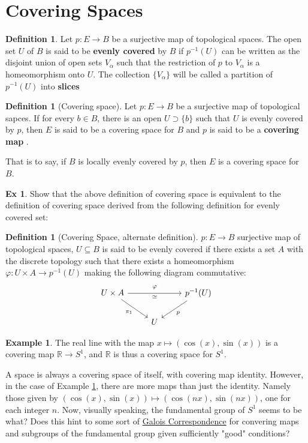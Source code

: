 \documentclass[10pt, openany]{book}
\newcommand{\bb}[1]{\mathbb{#1}}
\theoremstyle{plain}
\theoremstyle{definition}
\newtheorem{definition}[theorem]{Definition}
\newtheorem{exercise}{Ex}[section]
\newtheorem{example}{Example}
\theoremstyle{remark}
\begin{document}
\section{Covering Spaces}
\begin{definition}
  Let $p : E\rightarrow B$ be a surjective map of topological spaces. The open set $U$ of $B$ is said to be \textbf{evenly covered} by $B$ if $p^{-1}(U)$ can be written as the disjoint union of open sets $V_{\alpha}$ such that the restriction of $p$ to $V_{\alpha}$ is a homeomorphism onto $U$. The collection $\{V_{\alpha}\}$ will be called a partition of $p^{-1}(U)$ into \textbf{slices}
\end{definition}
\begin{definition}[Covering space]
  Let $p:E\rightarrow B$ be a surjective map of topological sapces. If for every $b\in B$, there is an open $U\supset \{b\}$ such that $U$ is evenly covered by $p$, then $E$ is said to be a covering space for $B$ and $p$ is said to be a \textbf{covering map }.
\end{definition}
That is to say, if $B$ is locally evenly covered by $p$, then $E$ is a covering space for $B$.
\begin{exercise}
  Show that the above definition of covering space is equivalent to the definition of covering space derived from the following definition for evenly covered set:
  \begin{definition}[Covering Space, alternate definition]
    $p:E\rightarrow B$ surjective map of topological spaces, $U\subseteq B$ is said to be evenly covered if there exists a set $A$ with the discrete topology such that there exists a homeomorphism $\varphi: U\times A\rightarrow p^{-1}(U)$ making the following diagram commutative:
    \[\begin{tikzcd}
	{U\times A} && {p^{-1}(U)} \\
	& U
	\arrow["\simeq"', from=1-1, to=1-3]
	\arrow["\varphi"{description}, shift left=3, draw=none, from=1-1, to=1-3]
	\arrow["{\pi_1}"', from=1-1, to=2-2]
	\arrow["p", from=1-3, to=2-2]
\end{tikzcd}\]
  \end{definition}
\end{exercise}
\begin{example}\label{example:S1R}
  The real line with the map $x \mapsto (\cos(x), \sin(x))$ is a covering map $\bb R\rightarrow S^1$, and $\bb R$ is thus a covering space for $S^1$.
\end{example}
A space is always a covering space of itself, with covering map identity. However, in the case of Example \ref{example:S1R}, there are more maps than just the identity. Namely those given by $(\cos(x), \sin(x))\mapsto (\cos(nx), \sin(nx))$, one for each integer $n$. Now, visually speaking, the fundamental group of $S^1$ seems to be what? Does this hint to some sort of \href{https://en.wikipedia.org/wiki/Fundamental_theorem_of_Galois_theory}{Galois Correspondence} for convering maps and subgroups of the fundamental group given sufficiently "good" conditions?
\end{document}
